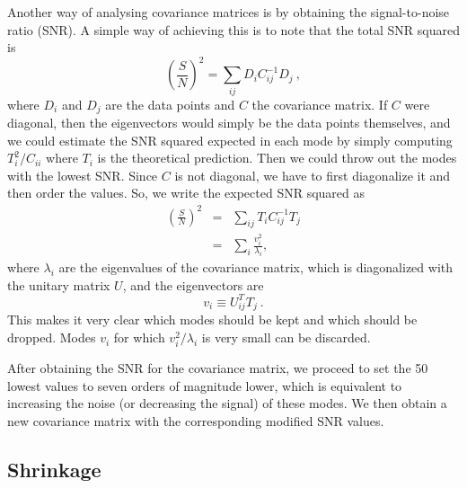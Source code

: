 \documentclass[twocolumn]{\docclass}
\newcommand\be{\begin{equation}}
\newcommand\ee{\end{equation}}
\def\bea{\begin{eqnarray}}
\def\eea{\end{eqnarray}}
\begin{document}
	Another way of analysing covariance matrices is by obtaining the signal-to-noise ratio (SNR). A simple way of achieving this is to note that the total SNR squared is
	\be
	\left(\frac{S}{N}\right)^2 = \sum_{ij} D_i C^{-1}_{ij} D_j\
	,\ee
	where $D_i$ and $D_j$ are the data points and $C$ the covariance matrix. If $C$ were diagonal, then the eigenvectors would simply be the data points themselves, and we could estimate the SNR squared expected in each mode by simply computing $T_i^2/C_{ii}$ where $T_i$ is the theoretical prediction. Then we could throw out the modes with the lowest SNR. Since $C$ is not diagonal, we have to first diagonalize it and then order the values. So, we write the expected SNR squared as
	\bea
	\left(\frac{S}{N}\right)^2 &=& \sum_{ij} T_i  C^{-1}_{ij} T_j\nonumber\\
	&=& \sum_{i} \frac{v_i^2}{\lambda_i}
	,\eea
	where $\lambda_i$ are the eigenvalues of the covariance matrix, which is diagonalized with the unitary matrix $U$, and the eigenvectors are 
	\be
	v_i\equiv U_{ij}^T T_j\
	.\ee
	This makes it very clear which modes should be kept and which should be dropped. Modes $v_i$ for which $v_i^2/\lambda_i$ is very small can be discarded. 
	
	After obtaining the SNR for the covariance matrix, we proceed to set the 50 lowest values to seven orders of magnitude lower, which is equivalent to increasing the noise (or decreasing the signal) of these modes. We then obtain a new covariance matrix with the corresponding modified SNR values. 
	
	
	\subsection{Shrinkage}
	\label{subsec:shrinkage}
	
	
\end{document}
